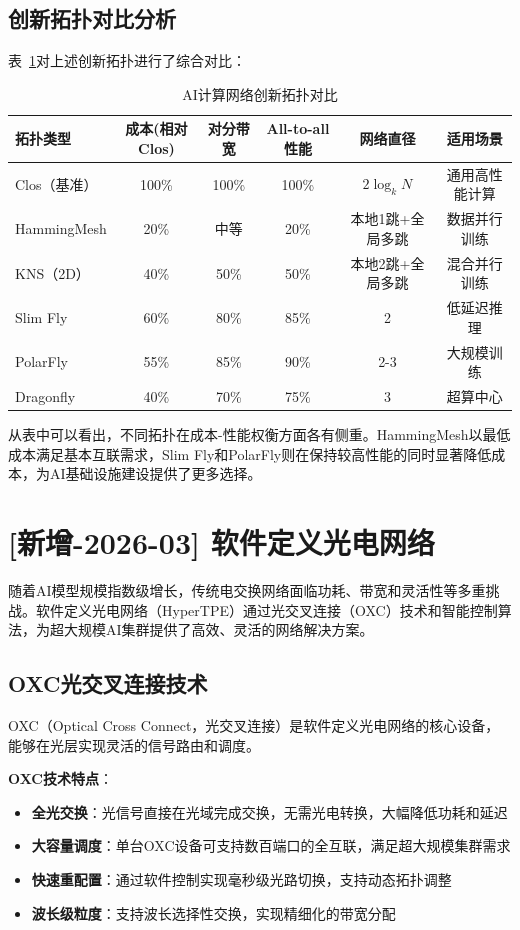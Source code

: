 \subsection{创新拓扑对比分析}

表~\ref{tab:topology_comparison}对上述创新拓扑进行了综合对比：

\begin{table}[htbp]
\centering
\caption{AI计算网络创新拓扑对比}
\label{tab:topology_comparison}
\begin{tabular}{|l|c|c|c|c|c|}
\hline
\textbf{拓扑类型} & \textbf{成本(相对Clos)} & \textbf{对分带宽} & \textbf{All-to-all性能} & \textbf{网络直径} & \textbf{适用场景} \\
\hline
Clos（基准） & 100\% & 100\% & 100\% & $2\log_k N$ & 通用高性能计算 \\
\hline
HammingMesh & 20\% & 中等 & 20\% & 本地1跳+全局多跳 & 数据并行训练 \\
\hline
KNS（2D） & 40\% & 50\% & 50\% & 本地2跳+全局多跳 & 混合并行训练 \\
\hline
Slim Fly & 60\% & 80\% & 85\% & 2 & 低延迟推理 \\
\hline
PolarFly & 55\% & 85\% & 90\% & 2-3 & 大规模训练 \\
\hline
Dragonfly & 40\% & 70\% & 75\% & 3 & 超算中心 \\
\hline
\end{tabular}
\end{table}

从表中可以看出，不同拓扑在成本-性能权衡方面各有侧重。HammingMesh以最低成本满足基本互联需求，Slim Fly和PolarFly则在保持较高性能的同时显著降低成本，为AI基础设施建设提供了更多选择。

\section{[新增-2026-03] 软件定义光电网络}

随着AI模型规模指数级增长，传统电交换网络面临功耗、带宽和灵活性等多重挑战。软件定义光电网络（HyperTPE）通过光交叉连接（OXC）技术和智能控制算法，为超大规模AI集群提供了高效、灵活的网络解决方案。

\subsection{OXC光交叉连接技术}

OXC（Optical Cross Connect，光交叉连接）是软件定义光电网络的核心设备，能够在光层实现灵活的信号路由和调度。

\textbf{OXC技术特点}：
\begin{itemize}
    \item \textbf{全光交换}：光信号直接在光域完成交换，无需光电转换，大幅降低功耗和延迟
    \item \textbf{大容量调度}：单台OXC设备可支持数百端口的全互联，满足超大规模集群需求
    \item \textbf{快速重配置}：通过软件控制实现毫秒级光路切换，支持动态拓扑调整
    \item \textbf{波长级粒度}：支持波长选择性交换，实现精细化的带宽分配
\end{itemize}

